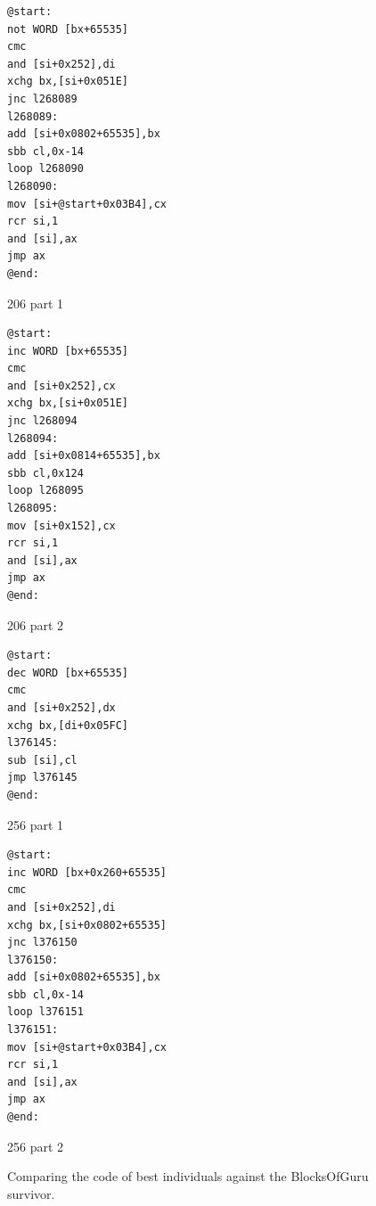 \documentclass[dvipsnames, format=sigconf]{acmart}
\begin{document}
\begin{figure}
\captionsetup{type=lstlisting}
\centering
\begin{sublstlisting}[b]{0.23\textwidth}
\begin{lstlisting}
@start:
not WORD [bx+65535]
cmc
and [si+0x252],di
xchg bx,[si+0x051E]
jnc l268089
l268089:
add [si+0x0802+65535],bx
sbb cl,0x-14
loop l268090
l268090:
mov [si+@start+0x03B4],cx
rcr si,1
and [si],ax
jmp ax
@end:
\end{lstlisting}
\caption{206 part 1}
\end{sublstlisting}
\hfill
\begin{sublstlisting}[b]{0.22\textwidth}
\begin{lstlisting}
@start:
inc WORD [bx+65535]
cmc
and [si+0x252],cx
xchg bx,[si+0x051E]
jnc l268094
l268094:
add [si+0x0814+65535],bx
sbb cl,0x124
loop l268095
l268095:
mov [si+0x152],cx
rcr si,1
and [si],ax
jmp ax
@end:
\end{lstlisting}
\caption{206 part 2}
\end{sublstlisting}
\hfill
\begin{sublstlisting}[b]{0.19\textwidth}
\begin{lstlisting}
@start:
dec WORD [bx+65535]
cmc
and [si+0x252],dx
xchg bx,[di+0x05FC]
l376145:
sub [si],cl
jmp l376145
@end:
\end{lstlisting}
\caption{256 part 1}
\end{sublstlisting}
\hfill
\begin{sublstlisting}[b]{0.24\textwidth}
\begin{lstlisting}
@start:
inc WORD [bx+0x260+65535]
cmc
and [si+0x252],di
xchg bx,[si+0x0802+65535]
jnc l376150
l376150:
add [si+0x0802+65535],bx
sbb cl,0x-14
loop l376151
l376151:
mov [si+@start+0x03B4],cx
rcr si,1
and [si],ax
jmp ax
@end:
\end{lstlisting}
\caption{256 part 2}
\end{sublstlisting}
\caption{Comparing the code of best individuals against the BlocksOfGuru survivor.}
\label{lst:BlocksOfGuru:a}
\end{figure}
\end{document}
